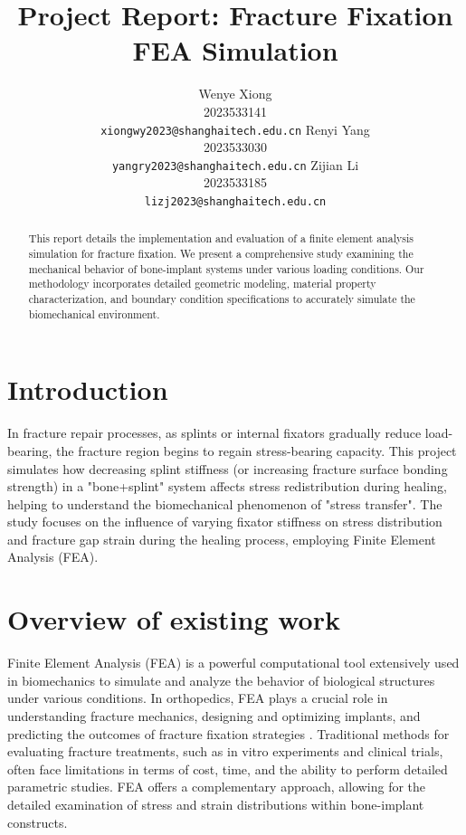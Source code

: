 \documentclass{article}
\title{Project Report: Fracture Fixation FEA Simulation}
\author{
  Wenye Xiong \\
  2023533141 \\
  \texttt{xiongwy2023@shanghaitech.edu.cn}
  \And
  Renyi Yang \\
  2023533030 \\
  \texttt{yangry2023@shanghaitech.edu.cn}
  \AND
  Zijian Li \\
  2023533185 \\
  \texttt{lizj2023@shanghaitech.edu.cn}
}
\begin{document}
\maketitle

\begin{abstract}
  This report details the implementation and evaluation of a finite element analysis simulation for fracture fixation. We present a comprehensive study examining the mechanical behavior of bone-implant systems under various loading conditions. Our methodology incorporates detailed geometric modeling, material property characterization, and boundary condition specifications to accurately simulate the biomechanical environment.
\end{abstract}



\section{Introduction}

In fracture repair processes, as splints or internal fixators gradually reduce load-bearing, the fracture region begins to regain stress-bearing capacity. This project simulates how decreasing splint stiffness (or increasing fracture surface bonding strength) in a "bone+splint" system affects stress redistribution during healing, helping to understand the biomechanical phenomenon of "stress transfer". The study focuses on the influence of varying fixator stiffness on stress distribution and fracture gap strain during the healing process, employing Finite Element Analysis (FEA).

\section{Overview of existing work}

Finite Element Analysis (FEA) is a powerful computational tool extensively used in biomechanics to simulate and analyze the behavior of biological structures under various conditions. In orthopedics, FEA plays a crucial role in understanding fracture mechanics, designing and optimizing implants, and predicting the outcomes of fracture fixation strategies \citep{lewis2021finite}. Traditional methods for evaluating fracture treatments, such as in vitro experiments and clinical trials, often face limitations in terms of cost, time, and the ability to perform detailed parametric studies. FEA offers a complementary approach, allowing for the detailed examination of stress and strain distributions within bone-implant constructs.
\end{document}
